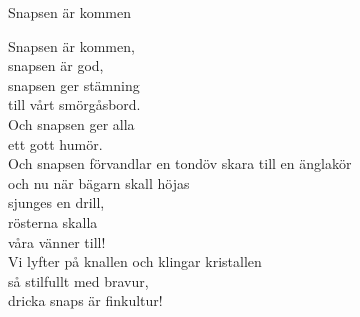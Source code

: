 \begin{song}{Snapsen är kommen}
	
	
	
	Snapsen är kommen,\\
	snapsen är god,\\
	snapsen ger stämning\\
	till vårt smörgåsbord.\\
	Och snapsen ger alla\\
	ett gott humör.\\
	Och snapsen förvandlar en tondöv skara till en änglakör\\
	och nu när bägarn skall höjas\\
	sjunges en drill,\\
	rösterna skalla\\
	våra vänner till!\\
	Vi lyfter på knallen och klingar kristallen\\
	så stilfullt med bravur,\\
	dricka snaps är finkultur!
	
\end{song}
